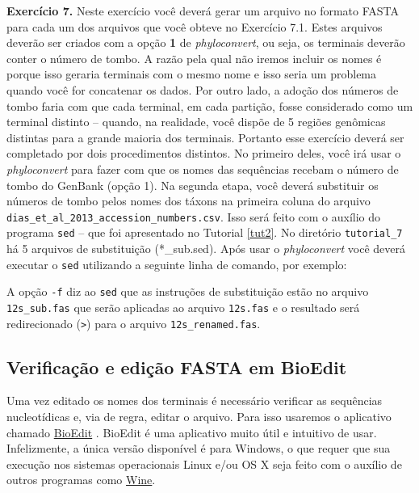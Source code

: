 \begin{refsection}
\begin{blackBlock}{\textbf{Exercício 7.}}
Neste exercício você deverá gerar um arquivo no formato FASTA para cada um dos arquivos que você obteve no Exercício 7.1. Estes arquivos deverão ser criados com a opção \textbf{1} de \textit{phyloconvert}, ou seja, os terminais deverão conter o número de tombo. A razão pela qual não iremos incluir os nomes é porque isso geraria terminais com o mesmo nome e isso seria um problema quando você for concatenar os dados. Por outro lado, a adoção dos números de tombo faria com que cada terminal, em cada partição, fosse considerado como um terminal distinto -- quando, na realidade, você dispõe de 5 regiões genômicas distintas para a grande maioria dos terminais. Portanto esse exercício deverá ser completado por dois procedimentos distintos. No primeiro deles, você irá usar o \textit{phyloconvert} para fazer com que os nomes das sequências recebam o número de tombo do GenBank (opção 1). Na segunda etapa, você deverá substituir os números de tombo pelos nomes dos táxons na primeira coluna do arquivo \texttt{dias\_et\_al\_2013\_accession\_numbers.csv}. Isso será feito com o auxílio do programa \texttt{sed} -- que foi apresentado no Tutorial \ref{tut2}. No diretório \texttt{tutorial\_7} há 5 arquivos de substituição (*\_sub.sed). Após usar o \textit{phyloconvert} você deverá executar o \texttt{sed} utilizando a seguinte linha de comando, por exemplo:\\

\end{blackBlock}

A opção \texttt{-f} diz ao \texttt{sed} que as instruções de substituição estão no arquivo \texttt{12s\_sub.fas} que serão aplicadas ao arquivo \texttt{12s.fas} e o resultado será redirecionado (\texttt{>}) para o arquivo \texttt{12s\_renamed.fas}.

\subsection{Verificação e edição FASTA em BioEdit}\label{tut7:handling_files:bioedit}

Uma vez editado os nomes dos terminais é necessário verificar as sequências nucleotídicas e, via de regra, editar o arquivo. Para isso usaremos o aplicativo chamado \href{http://www.mbio.ncsu.edu/bioedit/bioedit.html}{BioEdit} \parencite{Hall_1999}. BioEdit é uma aplicativo muito útil e intuitivo de usar. Infelizmente, a única versão disponível é  para Windows, o que requer que sua execução nos sistemas operacionais Linux e/ou OS X seja feito com o auxílio de outros programas como \href{http://www.winehq.org/}{Wine}.\\


\end{refsection}
